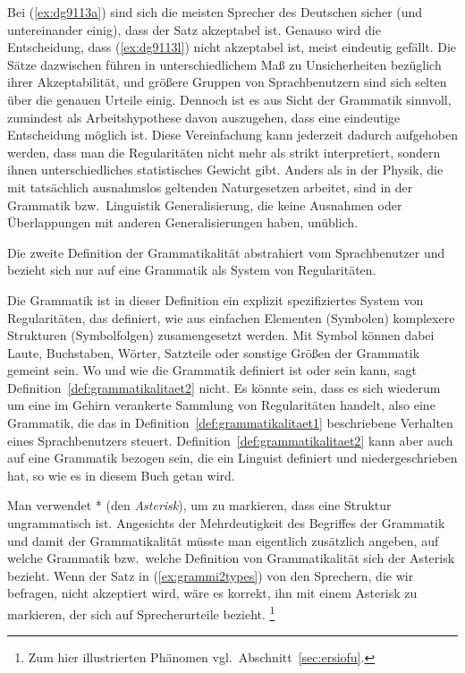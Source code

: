 Bei (\ref{ex:dg9113a}) sind sich die meisten Sprecher des Deutschen sicher (und untereinander einig), dass der Satz akzeptabel ist.
Genauso wird die Entscheidung, dass (\ref{ex:dg9113l}) nicht akzeptabel ist, meist eindeutig gefällt.
Die Sätze dazwischen führen in unterschiedlichem Maß zu Unsicherheiten bezüglich ihrer Akzeptabilität, und größere Gruppen von Sprachbenutzern sind sich selten über die genauen Urteile einig.
Dennoch ist es aus Sicht der Grammatik sinnvoll, zumindest als Arbeitshypothese davon auszugehen, dass eine eindeutige Entscheidung möglich ist.
Diese Vereinfachung kann jederzeit dadurch aufgehoben werden, dass man die Regularitäten nicht mehr als strikt interpretiert, sondern ihnen \zB unterschiedliches statistisches Gewicht gibt.
Anders als in der Physik, die mit tatsächlich ausnahmslos geltenden Naturgesetzen arbeitet, sind in der Grammatik bzw.\ Linguistik Generalisierung, die keine Ausnahmen oder Überlappungen mit anderen Generalisierungen haben, unüblich.

Die zweite Definition der Grammatikalität abstrahiert vom Sprachbenutzer und bezieht sich nur auf eine Grammatik als System von Regularitäten.


Die Grammatik ist in dieser Definition ein explizit spezifiziertes System von Regularitäten, das definiert, wie aus einfachen Elementen (Symbolen) komplexere Strukturen (Symbolfolgen) zusamengesetzt werden.
Mit Symbol können dabei Laute, Buchstaben, Wörter, Satzteile oder sonstige Größen der Grammatik gemeint sein.
Wo und wie die Grammatik definiert ist oder sein kann, sagt Definition~\ref{def:grammatikalitaet2} nicht.
Es könnte sein, dass es sich wiederum um eine im Gehirn verankerte Sammlung von Regularitäten handelt, also eine Grammatik, die das in Definition~\ref{def:grammatikalitaet1} beschriebene Verhalten eines Sprachbenutzers steuert.
Definition~\ref{def:grammatikalitaet2} kann aber auch auf eine Grammatik bezogen sein, die ein Linguist definiert und niedergeschrieben hat, so wie es in diesem Buch getan wird.

Man verwendet * (den \textit{Asterisk}), um zu markieren, dass eine Struktur ungrammatisch ist.
Angesichts der Mehrdeutigkeit des Begriffes der Grammatik und damit der Grammatikalität müsste man eigentlich zusätzlich angeben, auf welche Grammatik bzw.\ welche Definition von Grammatikalität sich der Asterisk bezieht.
Wenn der Satz in (\ref{ex:grammi2types}) von den Sprechern, die wir befragen, nicht akzeptiert wird, wäre es korrekt, ihn mit einem Asterisk zu markieren, der sich auf Sprecherurteile bezieht.%
\footnote{Zum hier illustrierten Phänomen vgl.\ Abschnitt~\ref{sec:ersiofu}.}

